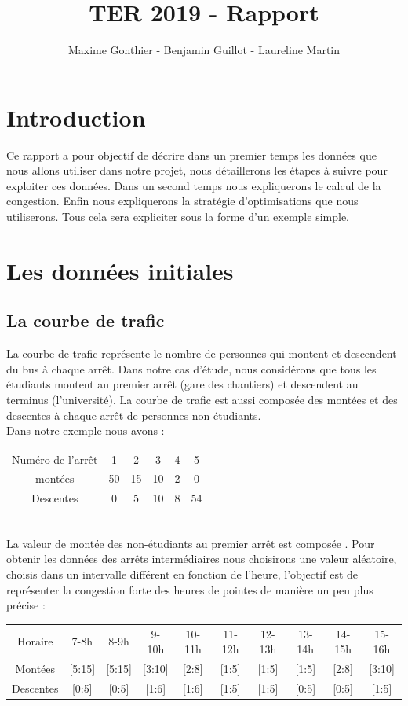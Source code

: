 \documentclass[a4paper,11pt]{article}
\title{TER 2019 - Rapport}
\author{Maxime Gonthier - Benjamin Guillot - Laureline Martin}
\begin{document}
\clearpage
\maketitle

\newpage
\tableofcontents

\newpage
\section{Introduction}
	Ce rapport a pour objectif de décrire dans un premier temps les données que nous allons utiliser dans notre projet, nous détaillerons les étapes à suivre pour exploiter ces données. Dans un second temps nous expliquerons le calcul de la congestion. Enfin nous expliquerons la stratégie d'optimisations que nous utiliserons. Tous cela sera expliciter sous la forme d'un exemple simple.

\section{Les données initiales}
	\subsection{La courbe de trafic}
		La courbe de trafic représente le nombre de personnes qui montent et descendent du bus à chaque arrêt. Dans notre cas d'étude, nous considérons que tous les étudiants montent au premier arrêt (gare des chantiers) et descendent au terminus (l'université). La courbe de trafic est aussi composée des montées et des descentes à chaque arrêt de personnes non-étudiants. \\
		Dans notre exemple nous avons : \\
		\begin{tabular}{ | c | c | c | c | c | c |}
 			\hline			
   			Numéro de l'arrêt	& 1 	& 2 	& 3 	& 4 	& 5\\
   			montées				& 50 	& 15 	& 10 	& 2 	& 0\\
   			Descentes			& 0 	& 5 	& 10 	& 8 	& 54\\
 			\hline  
 		\end{tabular}\\
 		La valeur de montée des non-étudiants au premier arrêt est composée .
 		Pour obtenir les données des arrêts intermédiaires nous choisirons une valeur aléatoire, choisis dans un intervalle différent en fonction de l'heure, l'objectif est de représenter la congestion forte des heures de pointes de manière un peu plus précise : \\
 		\begin{tabular}{ | c | c | c | c | c | c | c | c | c | c |}
 			\hline			
   			Horaire & 7-8h & 8-9h & 9-10h & 10-11h & 11-12h & 12-13h & 13-14h & 14-15h & 15-16h\\
   			Montées & [5:15] & [5:15] & [3:10] & [2:8] & [1:5] & [1:5] & [1:5] & [2:8] & [3:10]\\
   			Descentes & [0:5] & [0:5] & [1:6] & [1:6] & [1:5] & [1:5] & [0:5] & [0:5] & [1:5]\\
 			\hline  
 		\end{tabular}\\
\end{document}
